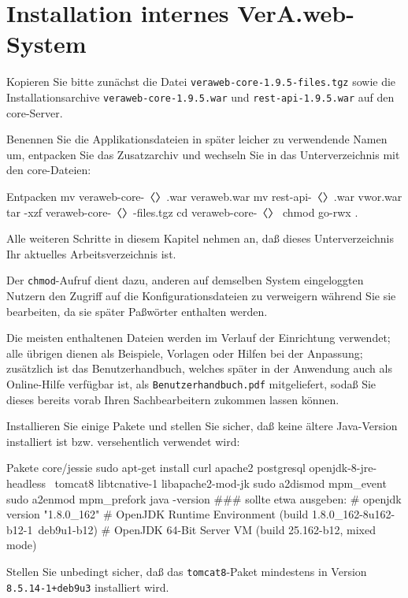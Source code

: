 \documentclass{tarentanleitung}
\newcommand{\vwiaverssw}{1.9.5}
\begin{document}
\section{Installation internes VerA.web-System}\label{sec:setup-int}

Kopieren Sie bitte zunächst die Datei
\texttt{veraweb-core-\vwiaverssw{}-files.tgz} sowie die
Installationsarchive \texttt{veraweb-core-\vwiaverssw{}.war}
und \texttt{rest-api-\vwiaverssw{}.war} auf den core-Server.

\begin{minipage}{\linewidth}
Benennen Sie die Applikationsdateien in später leicher zu
verwendende Namen um, entpacken Sie das Zusatzarchiv und
wechseln Sie in das Unterverzeichnis mit den core-Dateien:

\begin{lstdump}{Entpacken}
mv veraweb-core-〈\lstdumpesc{\vwiaverssw}〉.war veraweb.war
mv rest-api-〈\lstdumpesc{\vwiaverssw}〉.war vwor.war
tar -xzf veraweb-core-〈\lstdumpesc{\vwiaverssw}〉-files.tgz
cd veraweb-core-〈\lstdumpesc{\vwiaverssw}〉
chmod go-rwx .
\end{lstdump}
\end{minipage}

Alle weiteren Schritte in diesem Kapitel nehmen an, daß dieses
Unterverzeichnis Ihr aktuelles Arbeitsverzeichnis ist.

Der \texttt{chmod}-Aufruf dient dazu, anderen auf demselben System
eingeloggten Nutzern den Zugriff auf die Konfigurationsdateien zu
verweigern während Sie sie bearbeiten, da sie später Paßwörter
enthalten werden.

Die meisten enthaltenen Dateien werden im Verlauf der Einrichtung
verwendet; alle übrigen dienen als Beispiele, Vorlagen oder Hilfen
bei der Anpassung; zusätzlich ist das Benutzerhandbuch, welches
später in der Anwendung auch als Online-Hilfe verfügbar ist, als
\texttt{Benutzerhandbuch.pdf} mitgeliefert, sodaß Sie dieses bereits
vorab Ihren Sachbearbeitern zukommen lassen können.

\begin{minipage}{\linewidth}
Installieren Sie einige Pakete und stellen Sie sicher, daß keine
ältere Java-Version installiert ist bzw. versehentlich verwendet wird:

\begin{lstdump}{Pakete core/jessie}
sudo apt-get install curl apache2 postgresql openjdk-8-jre-headless \
    tomcat8 libtcnative-1 libapache2-mod-jk
sudo a2dismod mpm_event
sudo a2enmod mpm_prefork
java -version
### sollte etwa ausgeben:
# openjdk version "1.8.0_162"
# OpenJDK Runtime Environment (build 1.8.0_162-8u162-b12-1~deb9u1-b12)
# OpenJDK 64-Bit Server VM (build 25.162-b12, mixed mode)
\end{lstdump}

Stellen Sie unbedingt sicher, daß das \texttt{tomcat8}-Paket mindestens
in Version \texttt{8.5.14-1+deb9u3} installiert wird.
\end{minipage}
\end{document}
